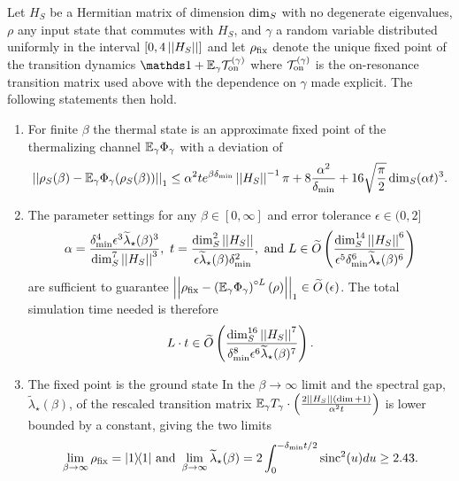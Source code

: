 \begin{theorem} \label{thm:zero_knowledge}
    Let $H_S$ be a Hermitian matrix of dimension ${\rm dim}_S$ with no degenerate eigenvalues, $\rho$ any input state that commutes with $H_S$, and $\gamma$ a random variable distributed uniformly in the interval $[0, 4 \left| \left| H_S \right| \right|]$ and
    let $\rho_{\rm fix}$ denote the unique fixed point of the transition dynamics $\identity + \EE_\gamma \TT_{\on}^{(\gamma)}$ where $\mathcal{T}_{\rm on}^{(\gamma)}$ is the on-resonance transition matrix used above with the dependence on $\gamma$ made explicit. The following statements then hold.
    \begin{enumerate}
\item For finite $\beta$ the thermal state is an approximate fixed point of the thermalizing channel $\mathbb{E}_\gamma \Phi_\gamma$ with a deviation of
    \begin{equation}
        \left| \left| \rho_S(\beta) - \mathbb{E}_\gamma \Phi_\gamma(\rho_S(\beta)) \right| \right|_1 \le \alpha^2 t e^{\beta \delta_{\min}} \left| \left| H_S \right| \right|^{-1} \pi + 8 \frac{\alpha^2}{\delta_{\min}} + 16 \sqrt{\frac{\pi}{2}} \dim_S (\alpha t)^3.
    \end{equation}
    \item   The parameter settings for any $\beta\in [0,\infty]$ and error tolerance $\epsilon \in (0,2]$
    \begin{align}
        \alpha = \frac{\delta_{\min}^4 \epsilon^{3} \widetilde{\lambda}_\star(\beta)^{3}}{\dim_S^7 \left| \left| H_S \right| \right|^3}, ~t = \frac{\dim_S^2 \left| \left| H_S \right| \right|}{\epsilon \widetilde{\lambda}_\star(\beta) \delta_{\min}^2}, \text{ and } L \in \widetilde{O} \left( \frac{\dim_S^{14} \left| \left| H_S \right| \right|^6}{\epsilon^5 \delta_{\min}^6 \widetilde{\lambda}_\star(\beta)^{6} } \right)
    \end{align}
    are sufficient to guarantee $\left| \left| \rho_{\rm fix} - \left(\mathbb{E}_\gamma \Phi_\gamma \right)^{\circ L}(\rho) \right| \right|_1 \in \widetilde{O} \left( \epsilon \right)$.
    The total simulation time needed is therefore
    \begin{equation}
        L \cdot t \in \widetilde{O} \left( \frac{\dim_S^{16} \left| \left| H_S \right| \right|^7}{\delta_{\min}^8 \epsilon^6 \widetilde{\lambda}_\star(\beta)^7} \right).
    \end{equation}
   \item    The fixed point is the ground state In the $\beta \to \infty$ limit and the spectral gap, $\widetilde{\lambda}_\star(\beta)$, of the rescaled transition matrix $\mathbb{E}_\gamma T_\gamma \cdot \left(\frac{2 \left| \left| H_S \right| \right| (\dim + 1)}{\alpha^2 t}\right)$ is lower bounded by a constant, giving the two limits
    \begin{equation}
        \lim_{\beta \to \infty} \rho_{\rm fix} = | 1\rangle\! \langle 1| \text{ and } \lim_{\beta \to \infty} \widetilde{\lambda}_\star(\beta) = 2 \int_{0}^{-\delta_{\min}t/2} \operatorname{sinc}^2(u) du \ge 2.43.
        \end{equation}

    \end{enumerate}
\end{theorem}
